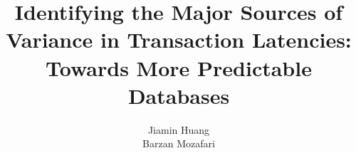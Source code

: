 \documentclass{vldb}
\begin{document}

\title{Identifying the Major Sources of Variance in Transaction Latencies:
Towards More Predictable Databases}



%
%
%
%


\author{
%
%
\alignauthor
Jiamin Huang\\
\alignauthor
Barzan Mozafari\\
}

\maketitle




















\end{document}
